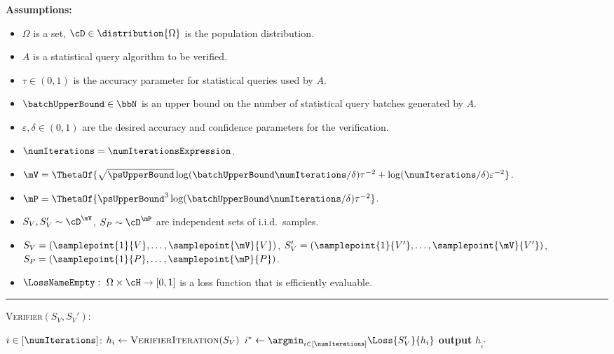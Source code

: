 \begin{protocol}[H]
	\begin{ShadedAlgorithmBox}
		{\bfseries Assumptions:} 
		\begin{itemize}
			\item{
				$\Omega$ is a set, $\cD \in \distribution{\Omega}$ is the population distribution.
			}
			\item{
				$A$ is a statistical query algorithm to be verified.
			}
			\item{
				$\tau \in (0,1)$ is the accuracy parameter for statistical queries used by $A$.
			}
			\item{
				$\batchUpperBound \in \bbN$ is an upper bound on the number of statistical query batches generated by $A$.
			}
			\item{
				$\varepsilon,\delta \in (0,1)$ are the desired accuracy and confidence parameters for the verification.
			}
			\item{
				$\numIterations = \numIterationsExpression$.
			}
			\item{
				$\mV = \ThetaOf{\sqrt{\psUpperBound}\log(\batchUpperBound \numIterations/\delta)\tau^{-2} + \log(\numIterations/\delta)\varepsilon^{-2}}$.
			}
			\item{
				$\mP = \ThetaOf{\psUpperBound^3\log(\batchUpperBound \numIterations/\delta)\tau^{-2}}$.
			}
			\item{
				$S_{V},S_{V}' \sim \cD^{\mV}$, $S_P \sim \cD^{\mP}$ are independent sets of i.i.d.\ samples.
			}
			\item{
				$S_{V} = (\samplepoint{1}{V},\dots,\samplepoint{\mV}{V})$, $S_{V}' = (\samplepoint{1}{V'},\dots,\samplepoint{\mV}{V'})$, $S_P = (\samplepoint{1}{P},\dots,\samplepoint{\mP}{P})$.
			}
			\item{
				$\LossNameEmpty: ~ \Omega \times \cH \rightarrow [0,1]$ is a loss function that is efficiently evaluable.
			}
		\end{itemize}
		
		\noindent\rule{\textwidth}{0.5pt}
		
		\vspace*{0.5em}
		
		\textsc{Verifier}$(S_V, S_V')$:
		\begin{algorithmic}
			\For $i \in [\numIterations]$: 
			\State $h_i \gets \textsc{VerifierIteration}(S_V)$
			\EndFor
			\State $i^* \gets \argmin_{i \in [\numIterations]} \Loss{S_V'}{h_i}$
			\State \textbf{output} $h_{i^*}$
		\end{algorithmic}
		

\end{ShadedAlgorithmBox}
\end{protocol}
